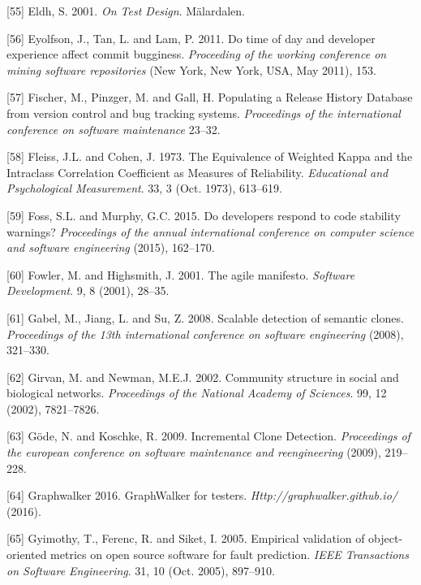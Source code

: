 \documentclass[12pt]{report}
\begin{document}
\hypertarget{ref-Eldh2001}{}
{[}55{]} Eldh, S. 2001. \emph{On Test Design}. Mälardalen.

\hypertarget{ref-Eyolfson2011}{}
{[}56{]} Eyolfson, J., Tan, L. and Lam, P. 2011. Do time of day and
developer experience affect commit bugginess. \emph{Proceeding of the
working conference on mining software repositories} (New York, New York,
USA, May 2011), 153.

\hypertarget{ref-Fischer}{}
{[}57{]} Fischer, M., Pinzger, M. and Gall, H. Populating a Release
History Database from version control and bug tracking systems.
\emph{Proceedings of the international conference on software
maintenance} 23--32.

\hypertarget{ref-Fleiss1973}{}
{[}58{]} Fleiss, J.L. and Cohen, J. 1973. The Equivalence of Weighted
Kappa and the Intraclass Correlation Coefficient as Measures of
Reliability. \emph{Educational and Psychological Measurement}. 33, 3
(Oct. 1973), 613--619.

\hypertarget{ref-Foss2015}{}
{[}59{]} Foss, S.L. and Murphy, G.C. 2015. Do developers respond to code
stability warnings? \emph{Proceedings of the annual international
conference on computer science and software engineering} (2015),
162--170.

\hypertarget{ref-fowler2001agile}{}
{[}60{]} Fowler, M. and Highsmith, J. 2001. The agile manifesto.
\emph{Software Development}. 9, 8 (2001), 28--35.

\hypertarget{ref-Gabel2008}{}
{[}61{]} Gabel, M., Jiang, L. and Su, Z. 2008. Scalable detection of
semantic clones. \emph{Proceedings of the 13th international conference
on software engineering} (2008), 321--330.

\hypertarget{ref-Girvan2002}{}
{[}62{]} Girvan, M. and Newman, M.E.J. 2002. Community structure in
social and biological networks. \emph{Proceedings of the National
Academy of Sciences}. 99, 12 (2002), 7821--7826.

\hypertarget{ref-Gode2009}{}
{[}63{]} Göde, N. and Koschke, R. 2009. Incremental Clone Detection.
\emph{Proceedings of the european conference on software maintenance and
reengineering} (2009), 219--228.

\hypertarget{ref-Graphwalker2016}{}
{[}64{]} Graphwalker 2016. GraphWalker for testers.
\emph{Http://graphwalker.github.io/} (2016).

\hypertarget{ref-Gyimothy2005}{}
{[}65{]} Gyimothy, T., Ferenc, R. and Siket, I. 2005. Empirical
validation of object-oriented metrics on open source software for fault
prediction. \emph{IEEE Transactions on Software Engineering}. 31, 10
(Oct. 2005), 897--910.
\end{document}
